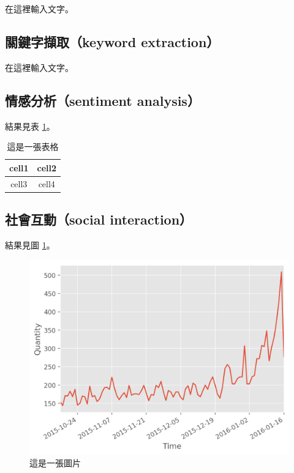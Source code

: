 \documentclass[letterpaper, 10pt, conference]{ieeeconf}   %
\begin{document}
\begin{CJK}{UTF8}{bsmi}
在這裡輸入文字。

\subsection*{關鍵字擷取（keyword extraction）}

在這裡輸入文字。

\subsection*{情感分析（sentiment analysis）}

結果見表 \ref{t1}。

\begin{table}[!htbp]
\caption{這是一張表格}
\label{t1}
\begin{center}
\begin{tabular}{|c|c|}
\hline
cell1 & cell2 \\
\hline
cell3 & cell4 \\
\hline
\end{tabular}
\end{center}
\end{table}

\subsection*{社會互動（social interaction）}

結果見圖 \ref{f1}。

\begin{figure}[!htbp]
\centering
\includegraphics[width=\columnwidth]{quantity_time_graph}
\caption{這是一張圖片}
\label{f1}
\end{figure}


\end{CJK}
\end{document}

